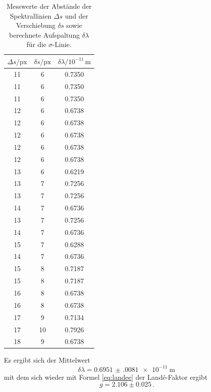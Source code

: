 \begin{table}[h]
    \centering
    \caption{Messwerte der Abstände der Spektrallinien $\Delta s$ und der Verschiebung $\delta s$ sowie berechnete Aufspaltung $\delta \lambda$ für die $\sigma$-Linie.}
    \label{tab:atab4}
    \begin{tabular}{c c c}
        \toprule
        {$\Delta s / \text{px}$} & {$\delta s / \text{px}$} & {$\delta \lambda / 10^{-11}\, \si{\meter}$}\\
        \midrule
        11 & 6  & 0.7350 \\
        11 & 6  & 0.7350 \\
        11 & 6  & 0.7350 \\
        12 & 6  & 0.6738 \\
        12 & 6  & 0.6738 \\
        12 & 6  & 0.6738 \\
        12 & 6  & 0.6738 \\
        12 & 6  & 0.6738 \\
        13 & 6  & 0.6219 \\
        13 & 7  & 0.7256 \\
        13 & 7  & 0.7256 \\
        14 & 7  & 0.6736 \\
        13 & 7  & 0.7256 \\
        14 & 7  & 0.6736 \\
        15 & 7  & 0.6288 \\
        14 & 7  & 0.6736 \\
        15 & 8  & 0.7187 \\
        15 & 8  & 0.7187 \\
        16 & 8  & 0.6738 \\
        16 & 8  & 0.6738 \\
        17 & 9  & 0.7134 \\
        17 & 10 & 0.7926 \\
        18 & 9  & 0.6738 \\
        \bottomrule
    \end{tabular}
\end{table}
\FloatBarrier
\noindent
Es ergibt sich der Mittelwert
\begin{equation*}
    \delta \lambda = \SI{0.6951(0081)e-11}{\meter} \, 
\end{equation*}
mit dem sich wieder mit Formel \eqref{eq:landee} der Landé-Faktor ergibt
\begin{equation*}
    g = 2.106 \pm 0.025 \, .
\end{equation*}

